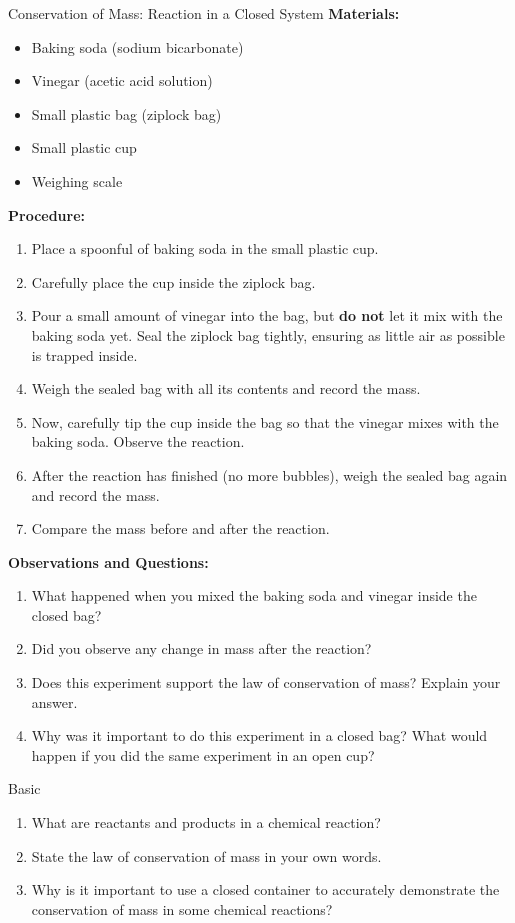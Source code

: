 \begin{investigation}{Conservation of Mass: Reaction in a Closed System}
\textbf{Materials:}
\begin{itemize}
    \item Baking soda (sodium bicarbonate)
    \item Vinegar (acetic acid solution)
    \item Small plastic bag (ziplock bag)
    \item Small plastic cup
    \item Weighing scale
\end{itemize}

\textbf{Procedure:}
\begin{enumerate}
    \item Place a spoonful of baking soda in the small plastic cup.
    \item Carefully place the cup inside the ziplock bag.
    \item Pour a small amount of vinegar into the bag, but \textbf{do not} let it mix with the baking soda yet. Seal the ziplock bag tightly, ensuring as little air as possible is trapped inside.
    \item Weigh the sealed bag with all its contents and record the mass.
    \item Now, carefully tip the cup inside the bag so that the vinegar mixes with the baking soda. Observe the reaction.
    \item After the reaction has finished (no more bubbles), weigh the sealed bag again and record the mass.
    \item Compare the mass before and after the reaction.
\end{enumerate}

\textbf{Observations and Questions:}
\begin{enumerate}
    \item What happened when you mixed the baking soda and vinegar inside the closed bag?
    \item Did you observe any change in mass after the reaction?
    \item Does this experiment support the law of conservation of mass? Explain your answer.
    \item Why was it important to do this experiment in a closed bag? What would happen if you did the same experiment in an open cup?
\end{enumerate}
\end{investigation}

\begin{tieredquestions}{Basic}
\begin{enumerate}
    \item  What are reactants and products in a chemical reaction?
    \item  State the law of conservation of mass in your own words.
    \item  Why is it important to use a closed container to accurately demonstrate the conservation of mass in some chemical reactions?
\end{enumerate}
\end{tieredquestions}

